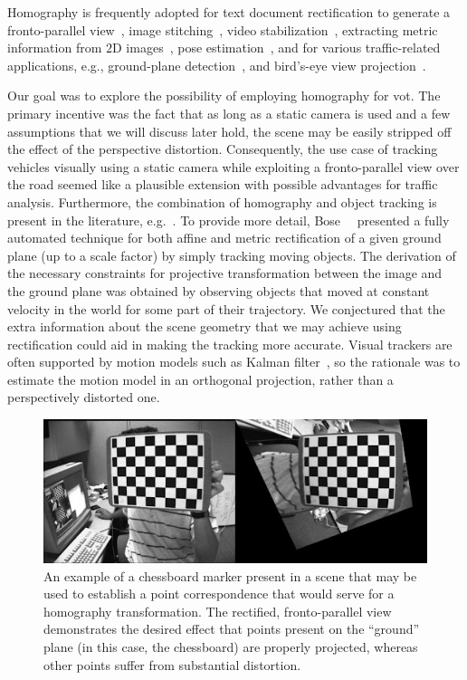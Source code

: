 Homography is frequently adopted for text document rectification to generate a fronto-parallel view~\cite{lu2005perspective, miao2006perspective}, image stitching~\cite{adel2014image, gao2011constructing}, video stabilization~\cite{liu2015smooth}, extracting metric information from $2$D images~\cite{zhang2000flexible}, pose estimation~\cite{mariyanayagam2018poseestim}, and for various traffic-related applications, e.g., ground-plane detection~\cite{arrospide2010homography}, and bird's-eye view projection~\cite{luo2010low}.

Our goal was to explore the possibility of employing homography for \gls{vot}. The primary incentive was the fact that as long as a static camera is used and a few assumptions that we will discuss later hold, the scene may be easily stripped off the effect of the perspective distortion. Consequently, the use case of tracking vehicles visually using a static camera while exploiting a fronto-parallel view over the road seemed like a plausible extension with possible advantages for traffic analysis. Furthermore, the combination of homography and object tracking is present in the literature, e.g.~\cite{bose2004groundplane, zhang2012homographytrack, Mei2009}. To provide more detail, Bose~\etal{}~\cite{bose2004groundplane} presented a fully automated technique for both affine and metric rectification of a given ground plane (up to a scale factor) by simply tracking moving objects. The derivation of the necessary constraints for projective transformation between the image and the ground plane was obtained by observing objects that moved at constant velocity in the world for some part of their trajectory. We conjectured that the extra information about the scene geometry that we may achieve using rectification could aid in making the tracking more accurate. Visual trackers are often supported by motion models such as Kalman filter~\cite{kalman1960linearfilter}, so the rationale was to estimate the motion model in an orthogonal projection, rather than a perspectively distorted one.

\begin{figure}[t]
    \centerline{\includegraphics[width=\linewidth]{figures/homography/chessboard_marker.jpg}}
    \caption[Chessboard marker]{An example of a chessboard marker present in a scene that may be used to establish a point correspondence that would serve for a homography transformation. The rectified, fronto-parallel view demonstrates the desired effect that points present on the ``ground'' plane (in this case, the chessboard) are properly projected, whereas other points suffer from substantial distortion. }
    \label{fig:ChessboardMarker}
\end{figure}

